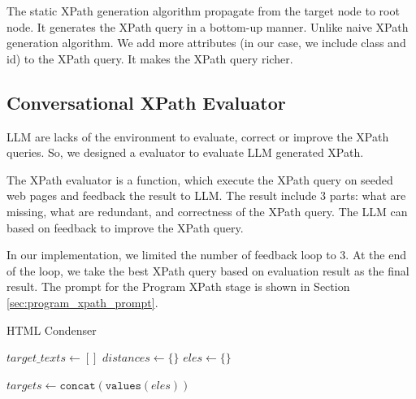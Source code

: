 \documentclass[a4paper]{article}
\begin{document}
The static XPath generation algorithm propagate from the target node to root node. It generates the XPath query in a bottom-up manner. Unlike naive XPath generation algorithm. We add more attributes (in our case, we include class and id) to the XPath query. It makes the XPath query richer.

\subsection{Conversational XPath Evaluator}

LLM are lacks of the environment to evaluate, correct or improve the XPath queries. So, we designed a evaluator to evaluate LLM generated XPath.

The XPath evaluator is a function, which execute the XPath query on seeded web pages and feedback the result to LLM. The result include 3 parts: what are missing, what are redundant, and correctness of the XPath query. The LLM can based on feedback to improve the XPath query.

In our implementation, we limited the number of feedback loop to 3. At the end of the loop, we take the best XPath query based on evaluation result as the final result. The prompt for the Program XPath stage is shown in Section \ref{sec:program_xpath_prompt}.


\begin{algorithm}
  \SetAlgoLined
  \caption{HTML Condenser}
  \label{alg:condenser}
  
  $target\_texts \gets []$\;
  $distances \gets \{\}$\;
  $eles \gets \{\}$\;
  

  $targets \gets \texttt{concat}(\texttt{values}(eles))$\;

\end{algorithm}
\end{document}

